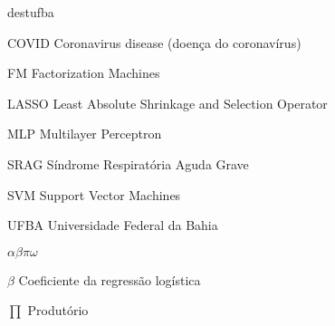 \documentclass[espec,ppgcdbd]{destufba}
\begin{document}
%
%
    \begin{listofabbrv}{destufba}
        \item[COVID] Coronavirus disease (doença do coronavírus)
        \item[FM] Factorization Machines
        \item[LASSO] Least Absolute Shrinkage and Selection Operator
        \item[MLP] Multilayer Perceptron
        \item[SRAG] Síndrome Respiratória Aguda Grave
        \item[SVM] Support Vector Machines
        \item[UFBA] Universidade Federal da Bahia
    \end{listofabbrv}

    \begin{listofsymbols}{$\alpha\beta\pi\omega$}
        \item[$\beta$] Coeficiente da regressão logística
        \item[$\prod$] Produtório
    \end{listofsymbols}

%
%
\end{document}
